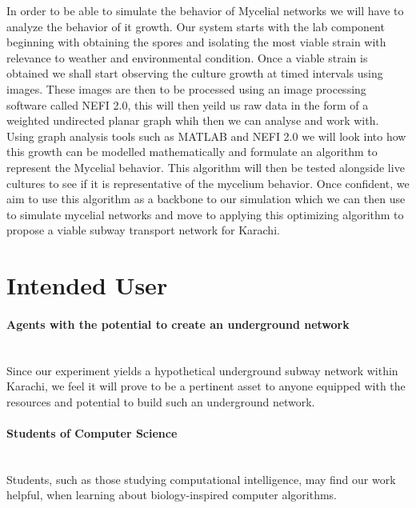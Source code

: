 In order to be able to simulate the behavior of Mycelial networks we will have to analyze the behavior of it growth. Our system starts with the lab component beginning with obtaining the spores and isolating the most viable strain with relevance to weather and environmental condition. Once a viable strain is obtained we shall start observing the culture growth at timed intervals using images. These images are then to be processed using an image processing software called NEFI 2.0, this will then yeild us raw data in the form of a weighted undirected planar graph whih then we can analyse and work with. Using graph analysis tools such as MATLAB and NEFI 2.0 we will look into how this growth can be modelled mathematically and formulate an algorithm to represent the Mycelial behavior. This algorithm will then be tested alongside live cultures to see if it is representative of the mycelium behavior. Once confident, we aim to use this algorithm as a backbone to our simulation which we can then use to simulate mycelial networks and move to applying this optimizing algorithm to propose a viable subway transport network for Karachi.

\section{Intended User}

\paragraph{Agents with the potential to create an underground network}
\mbox{}\\
Since our experiment yields a hypothetical underground subway network within Karachi, we feel it will prove to be a pertinent asset to anyone equipped with 
the resources and potential to build such an underground network. 

\paragraph{Students of Computer Science}
\mbox{}\\
Students, such as those studying computational intelligence, may find our work helpful, when learning about biology-inspired computer algorithms.

